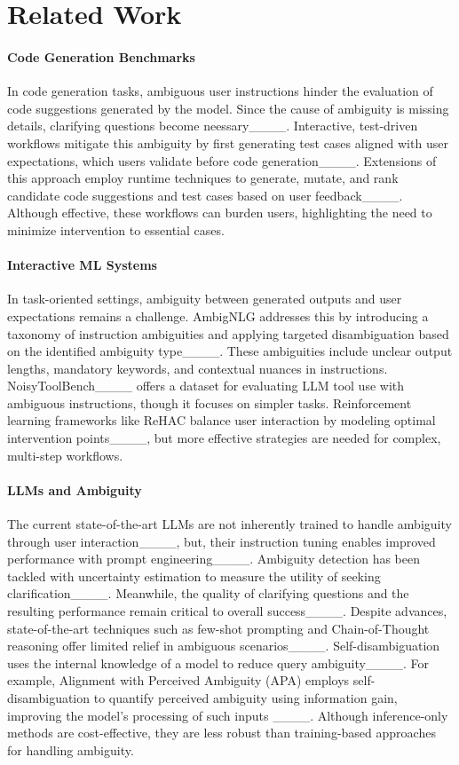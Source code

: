 \section{Related Work}
\label{sec:RelatedWorks}

\paragraph{Code Generation Benchmarks}
In code generation tasks,
ambiguous user instructions hinder the evaluation of code
suggestions generated by the model. Since the cause of
ambiguity is missing details, clarifying questions become
neessary____. Interactive, test-driven workflows mitigate this ambiguity by first generating test cases aligned with user expectations, which users validate before code generation____. Extensions of this approach employ runtime techniques to generate, mutate, and rank candidate code suggestions and test cases based on user feedback____. Although effective, these workflows can burden users, highlighting the need to minimize intervention to essential cases. 

\paragraph{Interactive ML Systems}
In task-oriented settings, ambiguity between generated outputs and user expectations remains a challenge. AmbigNLG addresses this by introducing a taxonomy of instruction ambiguities and applying targeted disambiguation based on the identified ambiguity type____. These ambiguities include unclear output lengths, mandatory keywords, and contextual nuances in instructions. NoisyToolBench____ offers a dataset for evaluating LLM tool use with ambiguous instructions, though it focuses on simpler tasks. Reinforcement learning frameworks like ReHAC balance user interaction by modeling optimal intervention points____, but more effective strategies are needed for complex, multi-step workflows.

\paragraph{LLMs and Ambiguity}
The current state-of-the-art LLMs
are not inherently trained to handle ambiguity through
user interaction____, but, their instruction
tuning enables improved performance with prompt engineering____. Ambiguity detection has been
tackled with uncertainty estimation to measure the utility
of seeking clarification____. Meanwhile, the quality of clarifying questions and
the resulting performance remain critical to overall success____. Despite advances, state-of-the-art techniques such as few-shot prompting and Chain-of-Thought
reasoning offer limited relief in ambiguous scenarios____. Self-disambiguation uses the internal knowledge of a
model to reduce query ambiguity____. For example,
Alignment with Perceived Ambiguity (APA) employs self-
disambiguation to quantify perceived ambiguity using information gain, improving the model’s processing of such
inputs ____. Although inference-only
methods are cost-effective, they are less robust than training-based approaches for handling ambiguity.